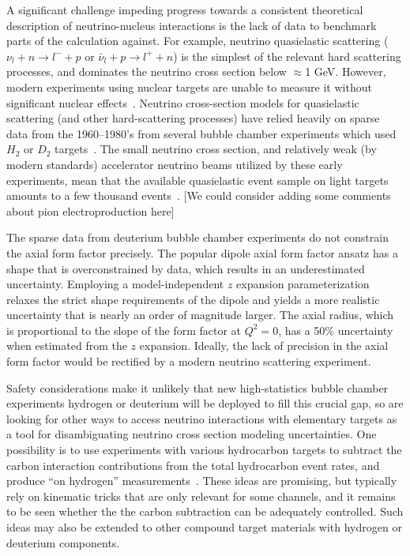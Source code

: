 A significant challenge impeding progress towards a consistent theoretical description of neutrino-nucleus interactions is the lack of data to benchmark parts of the calculation against. For example, neutrino quasielastic scattering ($\nu_{l} + n \rightarrow l^{-} + p$ or $\bar{\nu}_{l} + p \rightarrow l^{+} + n$) is the simplest of the relevant hard scattering processes, and dominates the neutrino cross section below  $\approx$1 GeV. However, modern experiments using nuclear targets are unable to measure it without significant nuclear effects~\cite{garvey_review_2014, NuSTEC:2017hzk}.
Neutrino cross-section models for quasielastic scattering (and other hard-scattering processes) have relied heavily on sparse data from the 1960--1980's from several bubble chamber experiments which used $H_{2}$ or $D_2$ targets~\cite{zeller12, ParticleDataGroup:2020ssz}.
The small neutrino cross section, and relatively weak (by modern standards) accelerator neutrino beams utilized by these early experiments, mean that the available quasielastic event sample on light targets amounts to a few thousand events~\cite{ANL_Barish_1977, BNL_Baker_1981}.
{\color{red} [We could consider adding some comments about pion electroproduction here]}

The sparse data from deuterium bubble chamber experiments do not constrain
 the axial form factor precisely.
The popular dipole axial form factor ansatz has a shape that
 is overconstrained by data, which results in an underestimated uncertainty.
Employing a model-independent $z$ expansion parameterization
 relaxes the strict shape requirements of the dipole and yields
 a more realistic uncertainty that is nearly an order of magnitude larger.
The axial radius, which is proportional to the slope of the form factor at $Q^2=0$,
 has a 50\% uncertainty when estimated from the $z$ expansion.
Ideally, the lack of precision in the axial form factor would
 be rectified by a modern neutrino scattering experiment.

Safety considerations make it unlikely that new high-statistics bubble chamber experiments 
hydrogen or deuterium will be deployed to fill this crucial gap,
so  are looking for other ways to access neutrino interactions
with elementary targets as a tool for disambiguating neutrino cross section modeling uncertainties.
One possibility is to use experiments with various hydrocarbon targets to subtract the carbon interaction contributions from
 the total hydrocarbon event rates, and produce ``on hydrogen'' measurements~\cite{PhysRevD.92.051302, PhysRevD.101.092003, Hamacher-Baumann:2020ogq, DUNE:2021tad}.
These ideas are promising, but typically rely on kinematic tricks that are only relevant for some channels, and it remains to be seen whether the  the carbon subtraction can be adequately controlled. Such ideas may also be extended to other compound target materials with hydrogen or deuterium components.


